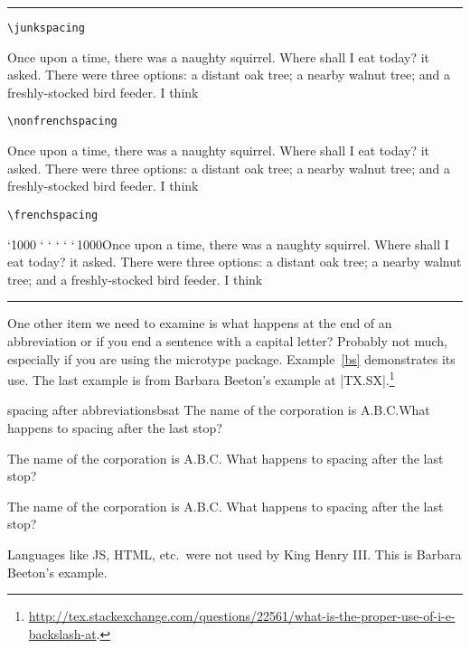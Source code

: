 \def\frenchspacing{\sfcode`\.1000 \sfcode`\?1000 \sfcode`\!1000
   \sfcode`\:1000 \sfcode`\;1000 \sfcode`\,1000}


 \let\tstory\frogking

\bigskip

\noindent\rule{\linewidth}{0.4pt}

\medskip
\narrower
{\hfill\hfill\small \texttt{\textbackslash junkspacing}}
\medskip


 \junkspacing Once upon a time, there was a naughty squirrel. Where shall I eat
     today? it asked. There were three options: a distant oak tree; a nearby 
    walnut tree; and a freshly-stocked bird feeder. I think\par

\bigskip

\smallskip
{\hfill\hfill\small \texttt{\textbackslash nonfrenchspacing}}

\medskip
\raggedright
     \nonfrenchspacing Once upon a time, there was a naughty squirrel. Where shall I eat
     today? it asked. There were three options: a distant oak tree; a nearby 
    walnut tree; and a freshly-stocked bird feeder. I think\par \par

\bigskip

\smallskip
{\hfill\hfill\noindent\small \texttt{\textbackslash frenchspacing}}

\medskip
     \frenchspacing Once upon a time, there was a naughty squirrel. Where shall I eat
     today? it asked. There were three options: a distant oak tree; a nearby 
    walnut tree; and a freshly-stocked bird feeder. I think\par \par

\medskip
\noindent\rule{\linewidth}{0.4pt}
\endgroup


One other item we need to examine is what happens at the end of an abbreviation or if you end a sentence with a capital letter? Probably not much, especially if you are using the microtype package. Example~\ref{bs} demonstrates its use. The last example is from Barbara Beeton's example at |TX.SX|.\footnote{\url{http://tex.stackexchange.com/questions/22561/what-is-the-proper-use-of-i-e-backslash-at}.}

\begin{texexample}{spacing after abbreviations}{bsat}
\makeatother
The name of the corporation is A.B.C.What happens to spacing after the last stop? 

The name of the corporation is A.B.C. What happens to spacing after the last stop?

The name of the corporation is A.B.C\@. What happens to spacing after the last stop?

Languages like JS, HTML, etc.\ were not used by King Henry III\@. This is Barbara Beeton's example.
\end{texexample}

